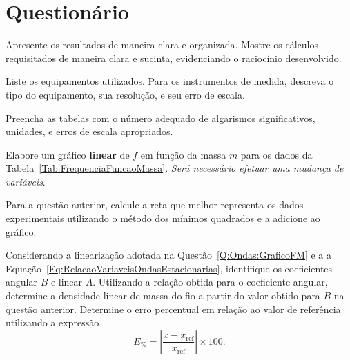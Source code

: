 \vspace{5mm}

\section{Questionário}

\begin{question}[type={exam}]{1}
Apresente os resultados de maneira clara e organizada. Mostre os cálculos requisitados de maneira clara e sucinta, evidenciando o raciocínio desenvolvido.
\end{question}

\begin{question}[type={exam}]{0.5}
Liste os equipamentos utilizados. Para os instrumentos de medida, descreva o tipo do equipamento, sua resolução, e seu erro de escala.
\end{question}

\begin{question}[type={exam}]{0.5}
Preencha as tabelas com o número adequado de algarismos significativos, unidades, e erros de escala apropriados. 
\end{question}

\begin{question}[type={exam}]{1}\label{Q:Ondas:GraficoFM}
Elabore um gráfico \textbf{linear} de $f$ em função da massa $m$ para os dados da Tabela~\ref{Tab:FrequenciaFuncaoMassa}. \emph{Será necessário efetuar uma mudança de variáveis}.
\end{question}

\begin{question}[type={exam}]{1}\label{Q:Ondas:CoeficientesRetaFM}
Para a questão anterior, calcule a reta que melhor representa os dados experimentais utilizando o método dos mínimos quadrados e a adicione ao gráfico.
\end{question}

\begin{question}[type={exam}]{1}
Considerando a linearização adotada na Questão~\ref{Q:Ondas:GraficoFM} e a a Equação~\eqref{Eq:RelacaoVariaveisOndasEstacionarias}, identifique os coeficientes angular $B$ e linear $A$. Utilizando a relação obtida para o coeficiente angular, determine a densidade linear de massa do fio a partir do valor obtido para $B$ na questão anterior. Determine o erro percentual em relação ao valor de referência utilizando a expressão 
\begin{equation}
	E_{\%} = \left|\frac{x-x_{\textrm{ref}}}{x_{\textrm{ref}}}\right| \times 100.
\end{equation}
\end{question}

